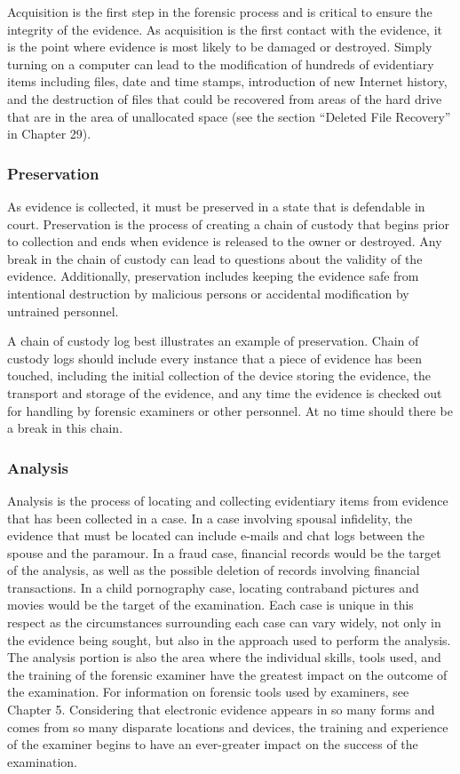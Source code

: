 Acquisition is the first step in the forensic process and is critical to ensure the
integrity of the evidence. As acquisition is the first contact with the evidence, it is
the point where evidence is most likely to be damaged or destroyed. Simply turning
on a computer can lead to the modification of hundreds of evidentiary items
including files, date and time stamps, introduction of new Internet history, and
the destruction of files that could be recovered from areas of the hard drive that
are in the area of unallocated space (see the section “Deleted File Recovery” in
Chapter 29).

\subsubsection{Preservation}

As evidence is collected, it must be preserved in a state that is defendable in court.
Preservation is the process of creating a chain of custody that begins prior to collection
and ends when evidence is released to the owner or destroyed. Any break
in the chain of custody can lead to questions about the validity of the evidence.
Additionally, preservation includes keeping the evidence safe from intentional
destruction by malicious persons or accidental modification by untrained personnel.

A chain of custody log best illustrates an example of preservation. Chain
of custody logs should include every instance that a piece of evidence has been
touched, including the initial collection of the device storing the evidence, the
transport and storage of the evidence, and any time the evidence is checked out for
handling by forensic examiners or other personnel. At no time should there be a
break in this chain.

\subsubsection{Analysis}

Analysis is the process of locating and collecting evidentiary items from evidence
that has been collected in a case. In a case involving spousal infidelity, the evidence
that must be located can include e-mails and chat logs between the spouse and the
paramour. In a fraud case, financial records would be the target of the analysis, as
well as the possible deletion of records involving financial transactions. In a child
pornography case, locating contraband pictures and movies would be the target of
the examination. Each case is unique in this respect as the circumstances surrounding
each case can vary widely, not only in the evidence being sought, but also in the
approach used to perform the analysis. The analysis portion is also the area where
the individual skills, tools used, and the training of the forensic examiner have
the greatest impact on the outcome of the examination. For information on forensic
tools used by examiners, see Chapter 5. Considering that electronic evidence
appears in so many forms and comes from so many disparate locations and devices,
the training and experience of the examiner begins to have an ever-greater impact
on the success of the examination.


